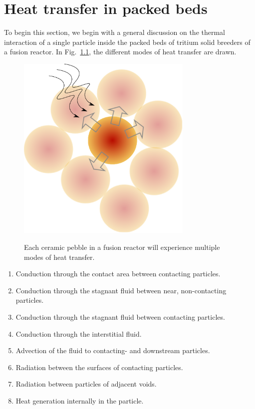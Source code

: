 \chapter{Heat transfer in packed beds} \label{sec:modeling-heat-transfer}
To begin this section, we begin with a general discussion on the thermal interaction of a single particle inside the packed beds of tritium solid breeders of a fusion reactor. In Fig.~\ref{fig:peb-comp-ht}, the different modes of heat transfer are drawn.

\begin{figure}[t]
	\centering
	\caption{Each ceramic pebble in a fusion reactor will experience multiple modes of heat transfer.}
	\includegraphics[width=0.75\textwidth]{chapters/figures/pebble-complete-heat-transfer}\label{fig:peb-comp-ht}
\end{figure}



\begin{enumerate}
\item Conduction through the contact area between contacting particles.
\item Conduction through the stagnant fluid between near, non-contacting particles.
\item Conduction through the stagnant fluid between contacting particles.
\item Conduction through the interstitial fluid. 
\item Advection of the fluid to contacting- and downstream particles.
\item Radiation between the surfaces of contacting particles.
\item Radiation between particles of adjacent voids.
\item Heat generation internally in the particle.
\end{enumerate}

